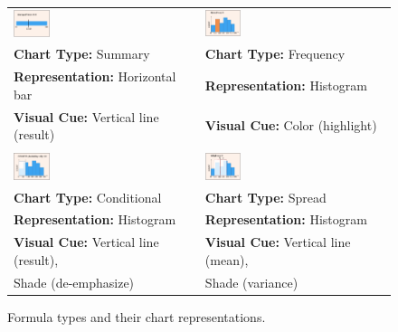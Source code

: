 \begin{figure}[t]
{
\scriptsize
   \centering
\begin{tabular}{l|l}
   \includegraphics[width=0.20\textwidth]{images/summary.png} &
   \includegraphics[width=0.20\textwidth]{images/frequency.png} \\
   \textbf{Chart Type:} Summary &  \textbf{Chart Type:} Frequency \\
 \textbf{Representation:} Horizontal bar &  \textbf{Representation:} Histogram \\
 \textbf{Visual Cue:} Vertical line (result) & 
 \textbf{Visual Cue:} Color (highlight) \\ \hline
    & \\
    \includegraphics[width=0.20\textwidth]{images/conditional.png}  &
   \includegraphics[width=0.20\textwidth]{images/spread.png} \\
      \textbf{Chart Type:} Conditional  &  \textbf{Chart Type:} Spread \\
 \textbf{Representation:} Histogram &  \textbf{Representation:} Histogram \\
 \textbf{Visual Cue:} Vertical line (result), & \textbf{Visual Cue:} Vertical line (mean),\\
Shade (de-emphasize) &  Shade (variance)
\vspace{-5pt}
\end{tabular}
}
\caption{Formula types and their chart representations.}
 \vspace{-15pt}
   \label{fig:agg}

\end{figure}
